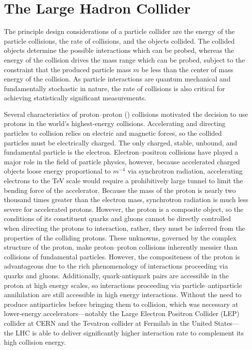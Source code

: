 \section{The Large Hadron Collider}
The principle design considerations of a particle collider are the energy
of the particle collisions, the rate of collisions, and the objects collided.
The collided objects determine the possible interactions which can be probed,
whereas the energy of the collision drives the mass range which can be probed,
subject to the constraint that the produced particle mass $m$ be less than the 
center of mass energy of the collision. As particle interactions are quantum mechanical 
and fundamentally stochastic in nature, the rate of collisions is also 
critical for achieving statistically significant measurements.

Several characteristics of proton--proton (\pp) collisions motivated the decision 
to use protons in the world's highest-energy collisions. Accelerating and
directing particles to collision relies on electric and magnetic forces,
so the collided particles must be electrically charged. 
The only charged, stable, unbound, and fundamental particle is the electron.
Electron--positron collisions have played a major role in the field 
of particle physics, however, because accelerated charged objects
loose energy proportional to $m^{-4}$ via synchrotron radiation,
accelerating electrons to the TeV scale would require a prohibitively large tunnel
to limit the bending force of the accelerator.
Because the mass of the proton is nearly two thousand times greater than the 
electron mass, synchrotron radiation is much less severe for accelerated protons.
However, the proton is a composite object, so the conditions of its constituent
quarks and gluons cannot be directly controlled when
directing the protons to interaction, rather, they must be inferred from 
the properties of the colliding protons. These unknowns, governed by the 
complex structure of the proton, make proton--proton collisions inherently
messier than collisions of fundamental particles. However, the compositeness
of the proton is advantageous due to the rich phenomenology of interactions
proceeding via quarks and gluons. 
Additionally, quark-antiquark pairs are accessible in the proton at high energy
scales, so interactions proceeding via particle--antiparticle annihilation
are still accessible in high energy \pp interactions. Without the need 
to produce antiparticles before bringing them to collision, which was necessary
at lower-energy accelerators---notably the Large Electron Positron Collider (LEP) collider
at CERN and the Tevatron collider at Fermilab in the United States---the LHC is
able to deliver significantly higher interaction rate to complement its high
collision energy.

